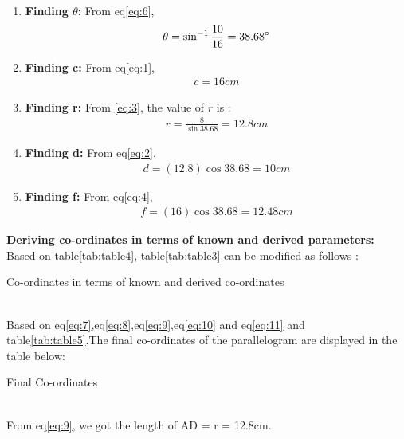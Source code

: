 \documentclass{article}
\begin{document}
\begin{enumerate}
	\item \textbf{Finding $\theta$:}
		From eq\ref{eq:6},
		\begin{align}
			\theta = \sin^{-1}\frac{10}{16} = 38.68\degree
			\label{eq:7}
		\end{align}
	\item \textbf{Finding c:}
		From eq\ref{eq:1},
		\begin{align}
			c = 16cm
			\label{eq:8}
		\end{align}
	\item \textbf{Finding r:}
		From \ref{eq:3}, the value of $r$ is :
		\begin{align}
			r = \frac{8}{\sin{38.68}} = 12.8cm
			\label{eq:9}
		\end{align}
	\item \textbf{Finding d:}
		From eq\ref{eq:2},
		\begin{align}
			d = (12.8)\cos{38.68} = 10cm
			\label{eq:10}
		\end{align}
	\item \textbf{Finding f:}
		From eq\ref{eq:4},
		\begin{align}
			f = (16)\cos{38.68} = 12.48cm
			\label{eq:11}
		\end{align}
\end{enumerate}
\textbf{Deriving co-ordinates in terms of known and derived parameters:}\\
Based on table\ref{tab:table4}, table\ref{tab:table3} can be modified as follows :\\
\begin{table}[h]
	\centering
	
	\caption{Co-ordinates in terms of known and derived co-ordinates}
	\label{tab:table5}
\end{table}\\
Based on eq\ref{eq:7},eq\ref{eq:8},eq\ref{eq:9},eq\ref{eq:10} and eq\ref{eq:11} and table\ref{tab:table5}.The final co-ordinates of the  parallelogram are displayed in the table below:\\
\begin{table}[h]
	\centering
	
	\caption{Final Co-ordinates}
	\label{tab:table6}
\end{table}\\
From eq\ref{eq:9}, we got the length of AD = r = 12.8cm.
\end{document}
